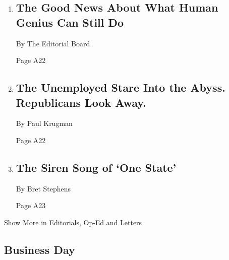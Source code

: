\begin{enumerate}
\def\labelenumi{\arabic{enumi}.}
\item
  \href{/2020/08/03/opinion/spacex-stonehenge-mars.html}{}

  \hypertarget{the-good-news-about-what-human-genius-can-still-do}{%
  \subsection{The Good News About What Human Genius Can Still
  Do}\label{the-good-news-about-what-human-genius-can-still-do}}

  By The Editorial Board

  Page A22
\item
  \href{/2020/08/03/opinion/republicans-unemployed-coronavirus.html}{}

  \hypertarget{the-unemployed-stare-into-the-abyss-republicans-look-away}{%
  \subsection{The Unemployed Stare Into the Abyss. Republicans Look
  Away.}\label{the-unemployed-stare-into-the-abyss-republicans-look-away}}

  By Paul Krugman

  Page A22
\item
  \href{/2020/08/03/opinion/israel-palestine-one-state-solution.html}{}

  \hypertarget{the-siren-song-of-one-state}{%
  \subsection{The Siren Song of `One
  State'}\label{the-siren-song-of-one-state}}

  By Bret Stephens

  Page A23
\end{enumerate}

Show More in Editorials, Op-Ed and Letters

\hypertarget{business-day}{%
\subsection{Business Day}\label{business-day}}

